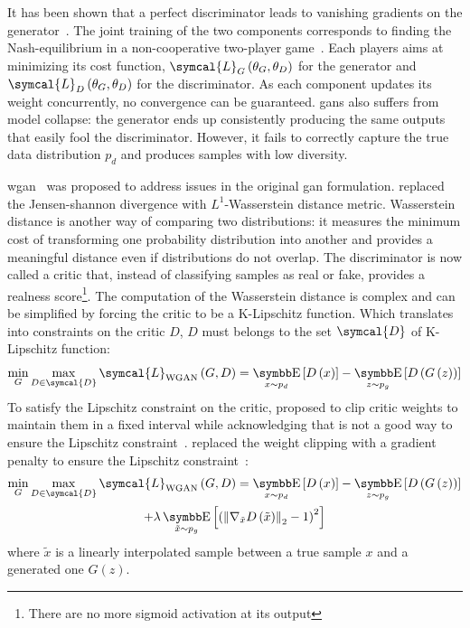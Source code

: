 \documentclass[../main.tex]{subfiles}
\begin{document}
		It has been shown that a perfect discriminator leads to vanishing gradients on the generator~\cite{Arjovsky2017TowardsPM}.
		The joint training of the two components corresponds to finding the Nash-equilibrium in a non-cooperative two-player game~\cite{Salimans2016ImprovedTF}.
		Each players aims at minimizing its cost function, \(\symcal{L}_{G}\left(\theta_{G}, \theta_{D}\right)\) for the generator and \(\symcal{L}_{D}\left(\theta_{G}, \theta_{D}\right)\) for the discriminator.
		As each component updates its weight concurrently, no convergence can be guaranteed.
		\Glspl{gan} also suffers from model collapse: the generator ends up consistently producing the same outputs that easily fool the discriminator.
		However, it fails to correctly capture the true data distribution \(p_{d}\) and produces samples with low diversity.

		\Gls{wgan}~\cite{WGAN} was proposed to address issues in the original \gls{gan} formulation.
		\citeauthor{WGAN} replaced the Jensen-shannon divergence with \(L^{1}\)-Wasserstein distance metric.
		Wasserstein distance is another way of comparing two distributions: it measures the minimum cost of transforming one probability distribution into another and provides a meaningful distance even if distributions do not overlap.
		The discriminator is now called a critic that, instead of classifying samples as real or fake, provides a realness score\footnote{There are no more sigmoid activation at its output}.
		The computation of the Wasserstein distance is complex and can be simplified by forcing the critic to be a K-Lipschitz function.
		Which translates into constraints on the critic \(D\), \(D\) must belongs to the set \( \symcal{D}\) of K-Lipschitz function:
		\begin{equation}
			\min_{G} \max_{D\in \symcal{D}} \symcal{L}_{\text{WGAN}}\left(G,D\right) = \E_{x\sim p_{d}}\left[ D\left(x\right)\right] - \E_{z\sim p_{g}}\left[ D\left(G\left(z\right)\right)\right] \label{eq:wgan_loss}
		\end{equation}
		To satisfy the Lipschitz constraint on the critic, \citeauthor{WGAN} proposed to clip critic weights to maintain them in a fixed interval while acknowledging that is not a good way to ensure the Lipschitz constraint~\cite{WGAN}.
		\citeauthor{WGANGP} replaced the weight clipping with a gradient penalty to ensure the Lipschitz constraint~\cite{WGANGP}:
		\begin{multline}
			\min_{G} \max_{D\in \symcal{D}} \symcal{L}_{\text{WGAN}}\left(G,D\right) = \E_{x\sim p_{d}}\left[ D\left(x\right)\right] - \E_{z\sim p_{g}}\left[ D\left(G\left(z\right)\right)\right] \\ + \lambda \E_{\tilde{x}\sim p_{g}}\left[ {\left( {\left\|\nabla_{\tilde{x}}D\left(\tilde{x}\right) \right\|}_{2} -1 \right)}^{2}\right]  \label{eq:wgangp_loss}
		\end{multline}
		where \(\tilde{x}\) is a linearly interpolated sample between a true sample \(x\) and a generated one \(G\left(z\right)\).
\end{document}
